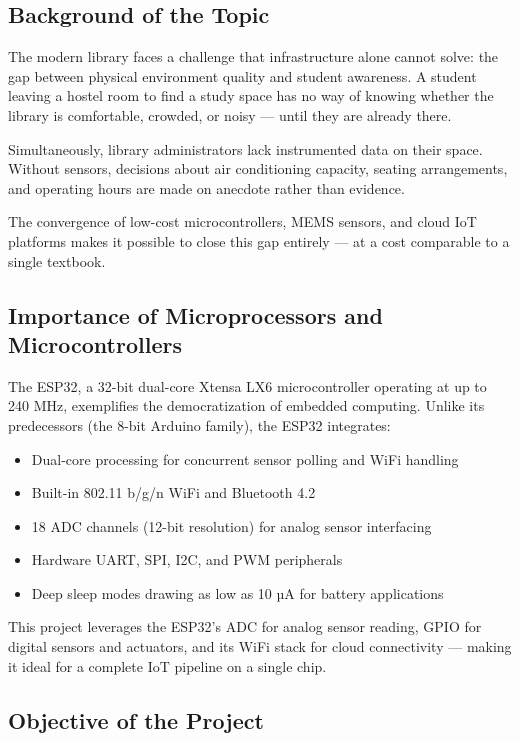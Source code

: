 \documentclass[12pt,a4paper]{article}
\begin{document}
\subsection{Background of the Topic}

The modern library faces a challenge that infrastructure alone cannot solve: the gap between physical environment quality and student awareness. A student leaving a hostel room to find a study space has no way of knowing whether the library is comfortable, crowded, or noisy — until they are already there.

Simultaneously, library administrators lack instrumented data on their space. Without sensors, decisions about air conditioning capacity, seating arrangements, and operating hours are made on anecdote rather than evidence.

The convergence of low-cost microcontrollers, MEMS sensors, and cloud IoT platforms makes it possible to close this gap entirely — at a cost comparable to a single textbook.

\subsection{Importance of Microprocessors and Microcontrollers}

The ESP32, a 32-bit dual-core Xtensa LX6 microcontroller operating at up to 240 MHz, exemplifies the democratization of embedded computing. Unlike its predecessors (the 8-bit Arduino family), the ESP32 integrates:

\begin{itemize}[leftmargin=1.5cm]
  \item Dual-core processing for concurrent sensor polling and WiFi handling
  \item Built-in 802.11 b/g/n WiFi and Bluetooth 4.2
  \item 18 ADC channels (12-bit resolution) for analog sensor interfacing
  \item Hardware UART, SPI, I2C, and PWM peripherals
  \item Deep sleep modes drawing as low as 10 µA for battery applications
\end{itemize}

This project leverages the ESP32's ADC for analog sensor reading, GPIO for digital sensors and actuators, and its WiFi stack for cloud connectivity — making it ideal for a complete IoT pipeline on a single chip.

\subsection{Objective of the Project}
\end{document}
